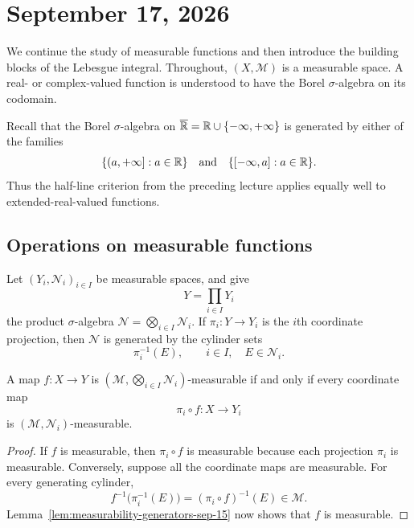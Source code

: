 \section{September 17, 2026}

We continue the study of measurable functions and then introduce the
building blocks of the Lebesgue integral.  Throughout, $(X,\mathcal M)$
is a measurable space.  A real- or complex-valued function is understood
to have the Borel $\sigma$-algebra on its codomain.

Recall that the Borel $\sigma$-algebra on
$\overline{\mathbb{R}}=\mathbb{R}\cup\{-\infty,+\infty\}$ is generated by either
of the families
\[
  \{(a,+\infty]:a\in\mathbb{R}\}
  \quad\text{and}\quad
  \{[-\infty,a]:a\in\mathbb{R}\}.
\]
Thus the half-line criterion from the preceding lecture applies equally
well to extended-real-valued functions.

\subsection{Operations on measurable functions}

Let $(Y_i,\mathcal N_i)_{i\in I}$ be measurable spaces, and give
\[
  Y=\prod_{i\in I}Y_i
\]
the product $\sigma$-algebra
$\mathcal N=\bigotimes_{i\in I}\mathcal N_i$.  If
$\pi_i\colon Y\to Y_i$ is the $i$th coordinate projection, then
$\mathcal N$ is generated by the cylinder sets
\[
  \pi_i^{-1}(E),
  \qquad i\in I,\quad E\in\mathcal N_i.
\]

\begin{lemma}
  \label{lem:product-coordinate-measurability-sep-17}
  A map $f\colon X\to Y$ is
  $(\mathcal M,\bigotimes_{i\in I}\mathcal N_i)$-measurable if and only if
  every coordinate map
  \[
    \pi_i\circ f\colon X\longrightarrow Y_i
  \]
  is $(\mathcal M,\mathcal N_i)$-measurable.
\end{lemma}

\begin{proof}
  If $f$ is measurable, then $\pi_i\circ f$ is measurable because each
  projection $\pi_i$ is measurable.  Conversely, suppose all the
  coordinate maps are measurable.  For every generating cylinder,
  \[
    f^{-1}\bigl(\pi_i^{-1}(E)\bigr)
    =(\pi_i\circ f)^{-1}(E)\in\mathcal M.
  \]
  Lemma~\ref{lem:measurability-generators-sep-15} now shows that $f$ is
  measurable.
\end{proof}

